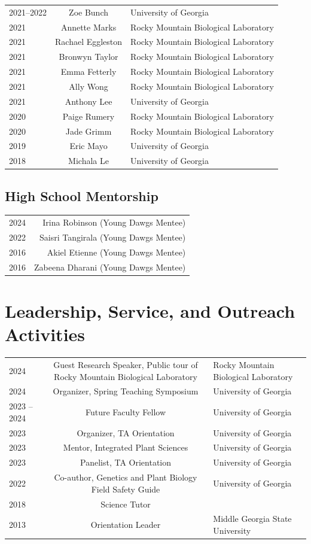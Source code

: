 \documentclass[letterpaper, 11pt]{article}
\begin{document}
\begin{longtable}{YCL}
 2021--2022 & Zoe Bunch & University of Georgia \\
 2021 & Annette Marks & Rocky Mountain Biological Laboratory \\
 2021 & Rachael Eggleston & Rocky Mountain Biological Laboratory \\
 2021 & Bronwyn Taylor & Rocky Mountain Biological Laboratory \\
 2021 & Emma Fetterly & Rocky Mountain Biological Laboratory \\
 2021 & Ally Wong & Rocky Mountain Biological Laboratory \\
 2021 & Anthony Lee & University of Georgia \\
 2020 & Paige Rumery & Rocky Mountain Biological Laboratory \\
 2020 & Jade Grimm & Rocky Mountain Biological Laboratory \\
 2019 & Eric Mayo & University of Georgia \\
 2018 & Michala Le & University of Georgia \\

 
 \end{longtable}

\subsection*{High School Mentorship}
 \begin{tabular}{DR}
2024 & Irina Robinson (Young Dawgs Mentee)\\
2022 & Saisri Tangirala (Young Dawgs Mentee)\\
2016 & Akiel Etienne (Young Dawgs Mentee)\\
2016 & Zabeena Dharani (Young Dawgs Mentee)\\
 \end{tabular}

\section*{Leadership, Service, and Outreach Activities}
\begin{tabular}{Y C L}
2024 & Guest Research Speaker, Public tour of Rocky Mountain Biological Laboratory & Rocky Mountain Biological Laboratory \\
2024 & Organizer, Spring Teaching Symposium & University of Georgia \\
2023 -- 2024 & Future Faculty Fellow & University of Georgia \\
2023 & Organizer, TA Orientation & University of Georgia \\
2023 & Mentor, Integrated Plant Sciences & University of Georgia \\ 
2023 & Panelist, TA Orientation & University of Georgia \\
2022 & Co-author, Genetics and Plant Biology Field Safety Guide & University of Georgia \\
2018 & Science Tutor \\
2013 & Orientation Leader & Middle Georgia State University \\
\end{tabular}
\end{document}
